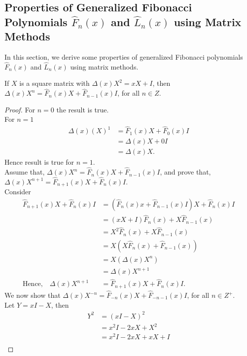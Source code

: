 \subsection{Properties of Generalized Fibonacci Polynomials $\widehat{F}_{ n}(x)$ and $\widehat{L}_{n}(x)$ using Matrix Methods}
In this section, we derive some properties of generalized Fibonacci polynomials  $\widehat{F}_{ n}(x)$ and $\widehat{L}_{n}(x)$ using matrix methods.
\begin{lemma} \label{lemma3}
If $X$ is a square matrix with $\Delta(x) X^2=xX+I$, then $ \Delta(x) X^{n}=\widehat{F}_{n}(x)X+\widehat{F}_{n-1}(x)I$, for all $n\in Z$.
\end{lemma}
\begin{proof}
For $n=0$ the result is true. \\
For $n=1$ 
\begin{align*}
\Delta(x)(X)^1&=\widehat{F}_{1}(x)X+\widehat{F}_{0}(x)I\\
		 &=\Delta(x) X+0I\\
		 &=\Delta(x) X.
\end{align*}		
Hence result is true for $n=1$. \\
Assume that, $ \Delta(x) X^{n}=\widehat{F}_{n}(x)X+\widehat{F}_{n-1}(x)I$, and prove that, $ \Delta(x) X^{n+1}=\widehat{F}_{n+1}(x)X+\widehat{F}_{n}(x)I$.\\
Consider
\begin{align*}
\widehat{F}_{n+1}(x)X+\widehat{F}_{n}(x)I&=(\widehat{F}_{n}(x)x+\widehat{F}_{n-1}(x)I)X+\widehat{F}_{n}(x)I\\
									 &=(xX+I)\widehat{F}_{n}(x)+X\widehat{F}_{n-1}(x)\\
									 &=X^2\widehat{F}_{n}(x)+X\widehat{F}_{n-1}(x)\\
									& =X(X\widehat{F}_{n}(x)+\widehat{F}_{n-1}(x))\\
									 &=X(\Delta(x) X^{n})\\
									& =\Delta(x) X^{n+1}\\\text{Hence,}\quad  \Delta(x) X^{n+1}&=\widehat{F}_{n+1}(x)X+\widehat{F}_{n}(x)I.
\end{align*}		
\noindent We now show that $ \Delta(x) X^{-n}=\widehat{F}_{-n}(x)X+\widehat{F}_{-n-1}(x)I$, for all $n\in Z^+$.\\
Let $Y=xI-X$, then
\begin{align*}
								Y^2&=(xI-X)^2\\
									 &=x^2I-2xX+X^2\\
									 &=x^2I-2xX+xX+I\\

\end{align*}
\end{proof}
